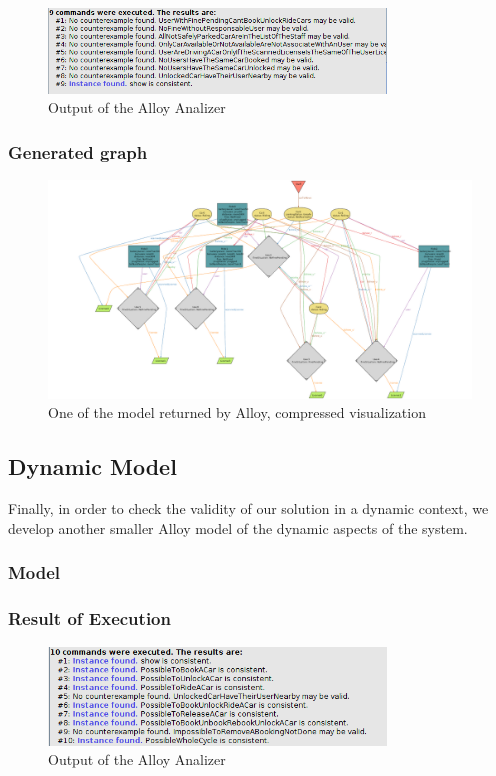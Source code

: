 \documentclass[11pt]{article} %
\begin{document}
\begin{figure}[H]
	\centering
	\includegraphics[width=0.8\textwidth]{Alloy/ConsistentStatic.png}
	\caption{Output of the Alloy Analizer}
\end{figure}

\subsubsection{Generated graph}

\begin{figure}[H]
	\centering
	\includegraphics[width=1\textwidth]{Alloy/Complete.png}
	\caption{One of the model returned by Alloy, compressed visualization}
\end{figure}

\subsection{Dynamic Model}

Finally, in order to check the validity of our solution in a dynamic context, we develop another smaller Alloy model of the dynamic aspects of the system.

\subsubsection{Model}


\subsubsection{Result of Execution}
\begin{figure}[H]
	\centering
	\includegraphics[width=0.8\textwidth]{Alloy/DynamicConsistent.png}
	\caption{Output of the Alloy Analizer}
\end{figure}
\end{document}
